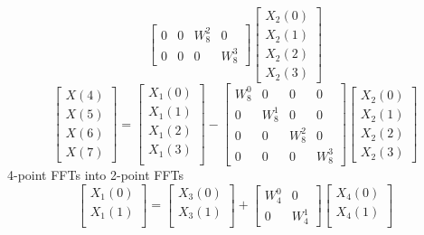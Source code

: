 \documentclass[journal,12pt,twocolumn]{IEEEtran}
\renewcommand\thesection{\arabic{section}}
\begin{document}
\begin{enumerate}[label=\arabic*.,ref=\thesection.\theenumi]
\begin{equation}
\begin{bmatrix}
0 & 0 & W^{2}_{8} & 0\\
0 & 0 & 0 & W^{3}_{8}
\end{bmatrix}
\begin{bmatrix}
X_{2}(0) \\ 
X_{2}(1) \\ 
X_{2}(2) \\
X_{2}(3)
\end{bmatrix}
\end{equation}
\begin{equation}
\begin{bmatrix}
X(4) \\ 
X(5) \\ 
X(6) \\ 
X(7)
\end{bmatrix}
=
\begin{bmatrix}
X_{1}(0) \\ 
X_{1}(1)\\ 
X_{1}(2)\\
X_{1}(3)\\
\end{bmatrix}
-
\begin{bmatrix}
W^{0}_{8} & 0 & 0 & 0\\
0 & W^{1}_{8} & 0 & 0\\
0 & 0 & W^{2}_{8} & 0\\
0 & 0 & 0 & W^{3}_{8}
\end{bmatrix}
\begin{bmatrix}
X_{2}(0) \\ 
X_{2}(1) \\ 
X_{2}(2) \\
X_{2}(3)
\end{bmatrix}
\end{equation}
4-point FFTs into 2-point FFTs
\begin{equation}
\begin{bmatrix}
X_{1}(0) \\ 
X_{1}(1)\\ 
\end{bmatrix}
=
\begin{bmatrix}
X_{3}(0) \\ 
X_{3}(1)\\ 
\end{bmatrix}
+
\begin{bmatrix}
W^{0}_{4} & 0\\
0 & W^{1}_{4}
\end{bmatrix}
\begin{bmatrix}
X_{4}(0) \\ 
X_{4}(1) \\ 

\end{bmatrix}
\end{equation}
\end{enumerate}
\end{document}
